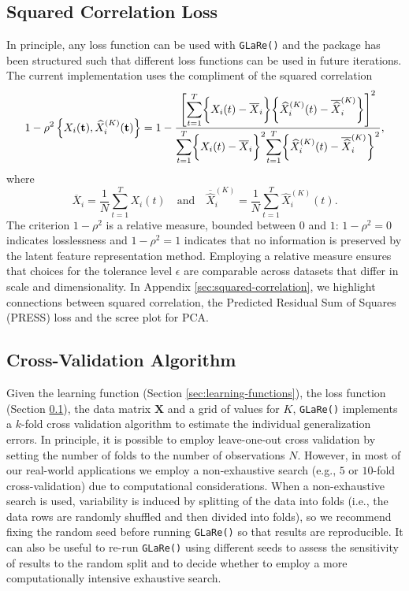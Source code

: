 \subsection{Squared Correlation Loss}\label{sec:loss-functions}

In principle, any loss function can be used with \texttt{GLaRe()} and the package has been structured such that different loss functions can be used in future iterations.
The current implementation uses the compliment of the squared correlation
$$
1- \rho^2 \left\{X_i (\mathbf{t}), \widehat{X}^{(K)}_{i} (\mathbf{t}) \right\} =
1 - \frac{\left[ \mathlarger{\sum}_{t = 1}^T{\bigg\{X_i (t) - \overline{X}_i \bigg\} \bigg\{ \widehat{X}_i^{(K)} (t) - \overline{\widehat{X}}_i^{(K)} \bigg\}} \right]^2}{\mathlarger{\sum}_{t = 1}^T \bigg\{X_i (t) - \overline{X}_i \bigg\}^2 \mathlarger{\sum}_{t = 1}^T \bigg\{ \widehat{X}_i^{(K)} (t) - \overline{\widehat{X}}_i^{(K)} \bigg\} ^2},
$$
where
$$
\overline{X}_i = \frac{1}{N} \sum_{t=1}^T X_i (t) \quad \text{and} \quad \overline{\widehat{X}}_i^{(K)} = \frac{1}{N} \sum_{t=1}^T \widehat{X}_i^{(K)} (t).
$$
The criterion $1- \rho^2$ is a relative measure, bounded between $0$ and $1$: $1- \rho^2 = 0$ indicates losslessness and $1- \rho^2 = 1$ indicates that no information is preserved by the latent feature representation method.
Employing a relative measure ensures that choices for the tolerance level $\epsilon$ are comparable across datasets that differ in scale and dimensionality.
In Appendix \ref{sec:squared-correlation}, we highlight connections between squared correlation, the Predicted Residual Sum of Squares (PRESS) loss and the scree plot for PCA.

\subsection{Cross-Validation Algorithm}

Given the learning function (Section \ref{sec:learning-functions}), the loss function (Section \ref{sec:loss-functions}), the data matrix $\mathbf{X}$ and a grid of values for $K$, \texttt{GLaRe()} implements a $k$-fold cross validation algorithm to estimate the individual generalization errors.
In principle, it is possible to employ leave-one-out cross validation by setting the number of folds to the number of observations $N$.
However, in most of our real-world applications we employ a non-exhaustive search (e.g., $5$ or $10$-fold cross-validation) due to computational considerations.
When a non-exhaustive search is used, variability is induced by splitting of the data into folds (i.e., the data rows are randomly shuffled and then divided into folds), so we recommend fixing the random seed before running \texttt{GLaRe()} so that results are reproducible.
It can also be useful to re-run \texttt{GLaRe()} using different seeds to assess the sensitivity of results to the random split and to decide whether to employ a more computationally intensive exhaustive search.

